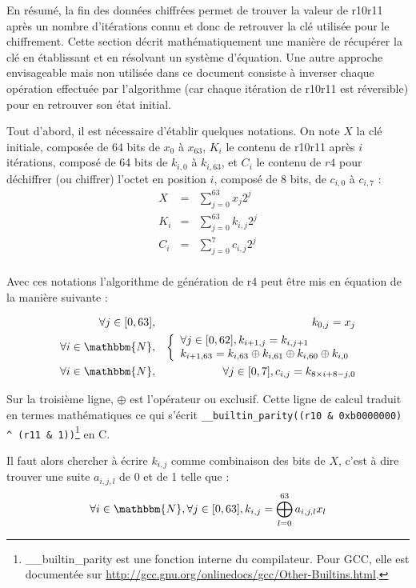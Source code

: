 \documentclass[a4paper,10pt]{article}
\begin{document}
En résumé, la fin des données chiffrées permet de trouver la valeur de r10r11 après un nombre d'itérations connu et donc de retrouver la clé utilisée pour le chiffrement. Cette section décrit mathématiquement une manière de récupérer la clé en établissant et en résolvant un système d'équation. Une autre approche envisageable mais non utilisée dans ce document consiste à inverser chaque opération effectuée par l'algorithme (car chaque itération de r10r11 est réversible) pour en retrouver son état initial.

Tout d'abord, il est nécessaire d'établir quelques notations. On note $X$ la clé initiale, composée de 64 bits de $x_0$ à $x_{63}$, $K_i$ le contenu de r10r11 après $i$ itérations, composé de 64 bits de $k_{i,0}$ à $k_{i,63}$, et $C_i$ le contenu de $r4$ pour déchiffrer (ou chiffrer) l'octet en position $i$, composé de 8 bits, de $c_{i,0}$ à $c_{i,7}$ :
\begin{eqnarray*}
X &=& \sum_{j = 0}^{63} x_j 2^j \\
K_i &=& \sum_{j = 0}^{63} k_{i,j} 2^j \\
C_i &=& \sum_{j = 0}^{7} c_{i,j} 2^j \\
\end{eqnarray*}

Avec ces notations l'algorithme de génération de r4 peut être mis en équation de la manière suivante :

\begin{eqnarray*}
\forall j \in [0, 63], && k_{0,j} = x_{j} \\
\forall i \in \mathbbm{N}, && \left\{\begin{array}{l}
    \forall j \in [0, 62], k_{i+1,j} = k_{i,j+1} \\
    k_{i+1,63} = k_{i,63} \oplus k_{i,61} \oplus k_{i,60} \oplus k_{i,0}
\end{array}\right. \\
\forall i \in \mathbbm{N}, && \forall j \in [0, 7], c_{i,j} = k_{8 \times i + 8 - j, 0}
\end{eqnarray*}

Sur la troisième ligne, $\oplus$ est l'opérateur ou exclusif. Cette ligne de calcul traduit en termes mathématiques ce qui s'écrit \texttt{\_\_builtin\_parity((r10 \& 0xb0000000) \^{ } (r11 \& 1))}\footnote{\_\_builtin\_parity est une fonction interne du compilateur. Pour GCC, elle est documentée sur \url{http://gcc.gnu.org/onlinedocs/gcc/Other-Builtins.html}.} en C.

Il faut alors chercher à écrire $k_{i,j}$ comme combinaison des bits de $X$, c'est à dire trouver une suite $a_{i,j,l}$ de 0 et de 1 telle que :
\begin{displaymath}
\forall i \in \mathbbm{N}, \forall j \in [0, 63], k_{i,j} = \bigoplus_{l=0}^{63} a_{i,j,l}x_l
\end{displaymath}
\end{document}

